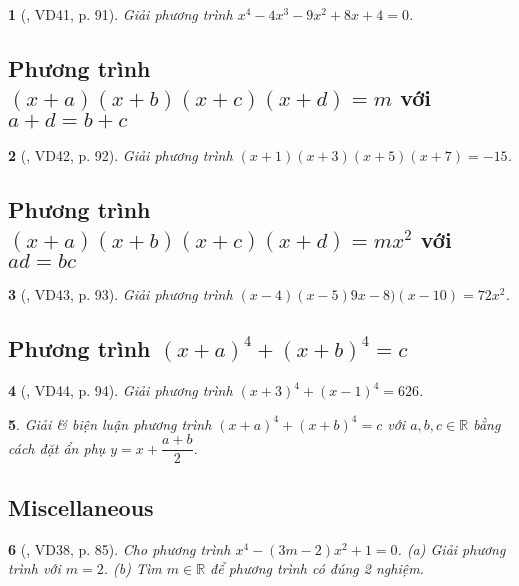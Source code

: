 \documentclass{article}
\newtheorem{baitoan}{}
\begin{document}
\begin{baitoan}[\cite{Tuyen_Toan_9_old}, VD41, p. 91]
	Giải phương trình $x^4 - 4x^3 - 9x^2 + 8x + 4 = 0$.
\end{baitoan}

\subsection{Phương trình $(x + a)(x + b)(x + c)(x + d) = m$ với $a + d = b + c$}

\begin{baitoan}[\cite{Tuyen_Toan_9_old}, VD42, p. 92]
	Giải phương trình $(x + 1)(x + 3)(x + 5)(x + 7) = -15$.
\end{baitoan}

\subsection{Phương trình $(x + a)(x + b)(x + c)(x + d) = mx^2$ với $ad = bc$}

\begin{baitoan}[\cite{Tuyen_Toan_9_old}, VD43, p. 93]
	Giải phương trình $(x - 4)(x - 5)9x - 8)(x - 10) = 72x^2$.
\end{baitoan}

\subsection{Phương trình $(x + a)^4 + (x + b)^4 = c$}

\begin{baitoan}[\cite{Tuyen_Toan_9_old}, VD44, p. 94]
	Giải phương trình $(x + 3)^4 + (x - 1)^4 = 626$.
\end{baitoan}

\begin{baitoan}
	Giải \& biện luận phương trình $(x + a)^4 + (x + b)^4 = c$ với $a,b,c\in\mathbb{R}$ bằng cách đặt ẩn phụ $y = x + \dfrac{a + b}{2}$.
\end{baitoan}

\subsection{Miscellaneous}

\begin{baitoan}[\cite{Tuyen_Toan_9_old}, VD38, p. 85]
	Cho phương trình $x^4 - (3m - 2)x^2 + 1 = 0$. (a) Giải phương trình với $m = 2$. (b) Tìm $m\in\mathbb{R}$ để phương trình có đúng 2 nghiệm.
\end{baitoan}
\end{document}
